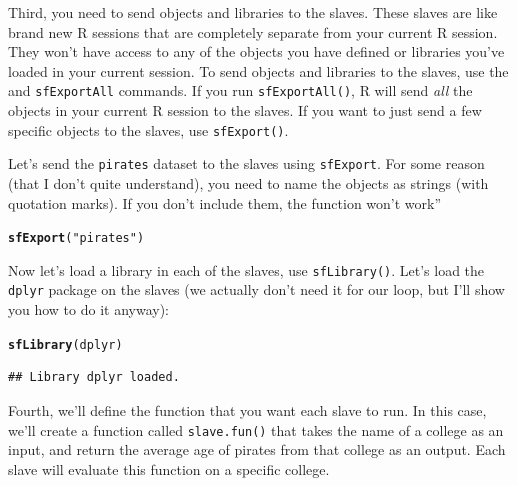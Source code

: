 \documentclass{tufte-book}\usepackage[]{graphicx}\usepackage[]{color}
\makeatletter
\newcommand{\hlstr}[1]{\textcolor[rgb]{0.192,0.494,0.8}{#1}}%
\newcommand{\hlstd}[1]{\textcolor[rgb]{0.345,0.345,0.345}{#1}}%
\newcommand{\hlkwd}[1]{\textcolor[rgb]{0.737,0.353,0.396}{\textbf{#1}}}%
\newenvironment{kframe}{%
 \def\at@end@of@kframe{}%
 \ifinner\ifhmode%
  \def\at@end@of@kframe{\end{minipage}}%
  \begin{minipage}{\columnwidth}%
 \fi\fi%
 \def\FrameCommand##1{\hskip\@totalleftmargin \hskip-\fboxsep
 \colorbox{shadecolor}{##1}\hskip-\fboxsep
     \hskip-\linewidth \hskip-\@totalleftmargin \hskip\columnwidth}%
 \MakeFramed {\advance\hsize-\width
   \@totalleftmargin\z@ \linewidth\hsize
   \@setminipage}}%
 {\par\unskip\endMakeFramed%
 \at@end@of@kframe}
\newenvironment{knitrout}{}{} %
\makeatother
\begin{document}
\begin{footnotesize}
Third, you need to send objects and libraries to the slaves. These slaves are like brand new R sessions that are completely separate from your current R session. They won't have access to any of the objects you have defined or libraries you've loaded in your current session. To send objects and libraries to the slaves, use the  and \texttt{sfExportAll} commands. If you run \texttt{sfExportAll()}, R will send \textit{all} the objects in your current R session to the slaves. If you want to just send a few specific objects to the slaves, use \texttt{sfExport()}.

Let's send the \texttt{pirates} dataset to the slaves using \texttt{sfExport}. For some reason (that I don't quite understand), you need to name the objects as strings (with quotation marks). If you don't include them, the function won't work''

\begin{knitrout}
\color{fgcolor}\begin{kframe}
\begin{alltt}
\hlkwd{sfExport}\hlstd{(}\hlstr{"pirates"}\hlstd{)}
\end{alltt}
\end{kframe}
\end{knitrout}

Now let's load a library in each of the slaves, use \texttt{sfLibrary()}. Let's load the \texttt{dplyr} package on the slaves (we actually don't need it for our loop, but I'll show you how to do it anyway):

\begin{knitrout}
\color{fgcolor}\begin{kframe}
\begin{alltt}
\hlkwd{sfLibrary}\hlstd{(dplyr)}
\end{alltt}
\begin{verbatim}
## Library dplyr loaded.
\end{verbatim}


{\ttfamily\noindent\itshape\color{messagecolor}{\#\# Library dplyr loaded in cluster.}}\end{kframe}
\end{knitrout}

Fourth, we'll define the function that you want each slave to run. In this case, we'll create a function called \texttt{slave.fun()} that takes the name of a college as an input, and return the average age of pirates from that college as an output. Each slave will evaluate this function on a specific college.


\end{footnotesize}
\end{document}
